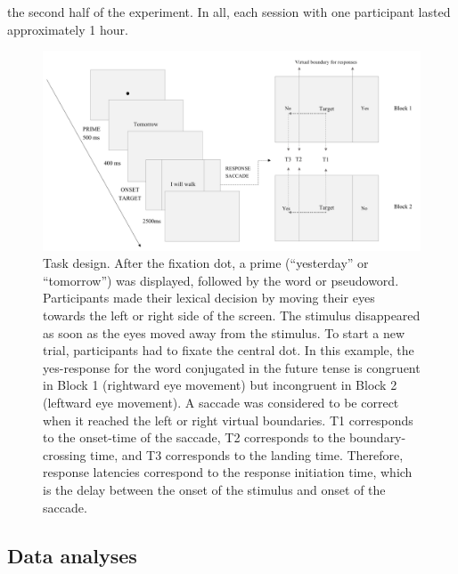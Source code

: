 \documentclass[
  a4paper,12pt,twoside,onecolumn,openright,final,oldfontcommands]{memoir}
\begin{document}
the second half of the experiment. In all, each session with one participant lasted approximately 1 hour.

\begin{figure}[htbp!]

{\centering \includegraphics[width=1\linewidth]{figures/chap-4-fig1} 

}

\caption{Task design. After the fixation dot, a prime (“yesterday” or “tomorrow”) was displayed, followed by the word or pseudoword. Participants made their lexical decision by moving their eyes towards the left or right side of the screen. The stimulus disappeared as soon as the eyes moved away from the stimulus. To start a new trial, participants had to fixate the central dot. In this example, the yes-response for the word conjugated in the future tense is congruent in Block 1 (rightward eye movement) but incongruent in Block 2 (leftward eye movement). A saccade was considered to be correct when it reached the left or right virtual boundaries. T1 corresponds to the onset-time of the saccade, T2 corresponds to the boundary-crossing time, and T3 corresponds to the landing time. Therefore, response latencies correspond to the response initiation time, which is the delay between the onset of the stimulus and onset of the saccade.}\label{fig:chap-4-fig1}
\end{figure}

\hypertarget{data-analyses-1}{%
\subsection{Data analyses}\label{data-analyses-1}}
\end{document}

